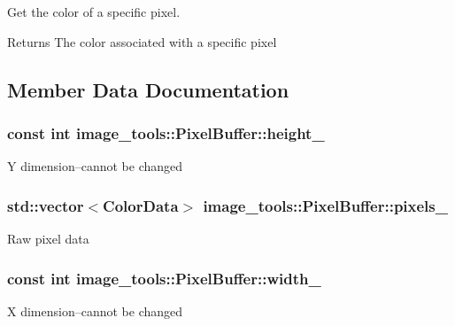 Get the color of a specific pixel. 

\begin{DoxyReturn}{Returns}
The color associated with a specific pixel 
\end{DoxyReturn}


\subsection{Member Data Documentation}
\subsubsection[{\texorpdfstring{height\+\_\+}{height_}}]{\setlength{\rightskip}{0pt plus 5cm}const int image\+\_\+tools\+::\+Pixel\+Buffer\+::height\+\_\+\hspace{0.3cm}{\ttfamily [private]}}\hypertarget{classimage__tools_1_1PixelBuffer_ae104466eae109324a4a0daa0bc14c980}{}\label{classimage__tools_1_1PixelBuffer_ae104466eae109324a4a0daa0bc14c980}
Y dimension--cannot be changed 
\subsubsection[{\texorpdfstring{pixels\+\_\+}{pixels_}}]{\setlength{\rightskip}{0pt plus 5cm}std\+::vector$<${\bf Color\+Data}$>$ image\+\_\+tools\+::\+Pixel\+Buffer\+::pixels\+\_\+\hspace{0.3cm}{\ttfamily [private]}}\hypertarget{classimage__tools_1_1PixelBuffer_a0c52483e7e29f111acf98474105f2409}{}\label{classimage__tools_1_1PixelBuffer_a0c52483e7e29f111acf98474105f2409}
Raw pixel data 
\subsubsection[{\texorpdfstring{width\+\_\+}{width_}}]{\setlength{\rightskip}{0pt plus 5cm}const int image\+\_\+tools\+::\+Pixel\+Buffer\+::width\+\_\+\hspace{0.3cm}{\ttfamily [private]}}\hypertarget{classimage__tools_1_1PixelBuffer_ac67206a6b428c7b33bd7f90f65b8c171}{}\label{classimage__tools_1_1PixelBuffer_ac67206a6b428c7b33bd7f90f65b8c171}
X dimension--cannot be changed 

